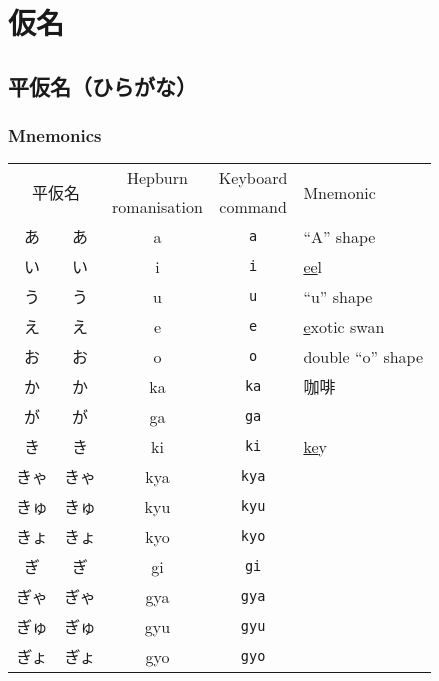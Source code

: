 \documentclass{article}
\begin{document}

\pagebreak

\section{仮名}
\subsection{平仮名（ひらがな）}
\subsubsection{Mnemonics}

\begin{longtable}[c]{@{}ccccl@{}}
    \toprule
    \multicolumn{2}{c}{\multirow{2}{*}{平仮名}} & Hepburn & Keyboard & \multirow{2}{*}{Mnemonic} \\
    \multicolumn{2}{c}{} & romanisation & command & \\* \midrule
    あ & {\sffamily あ} & a & \texttt{a} & ``A'' shape \\
    い & {\sffamily い} & i & \texttt{i} & \ul{ee}l \\
    う & {\sffamily う} & u & \texttt{u} & ``u'' shape \\
    え & {\sffamily え} & e & \texttt{e} & \ul{e}xotic swan \\
    お & {\sffamily お} & o & \texttt{o} & double ``o'' shape \\
    か & {\sffamily か} & ka & \texttt{ka} & 咖啡 \\
    が & {\sffamily が} & ga & \texttt{ga} &  \\
    き & {\sffamily き} & ki & \texttt{ki} & \ul{ke}y \\
    きゃ & {\sffamily きゃ} & kya & \texttt{kya} &  \\
    きゅ & {\sffamily きゅ} & kyu & \texttt{kyu} &  \\
    きょ & {\sffamily きょ} & kyo & \texttt{kyo} &  \\
    ぎ & {\sffamily ぎ} & gi & \texttt{gi} &  \\
    ぎゃ & {\sffamily ぎゃ} & gya & \texttt{gya} &  \\
    ぎゅ & {\sffamily ぎゅ} & gyu & \texttt{gyu} &  \\
    ぎょ & {\sffamily ぎょ} & gyo & \texttt{gyo} &  \\

\end{longtable}
\end{document}
